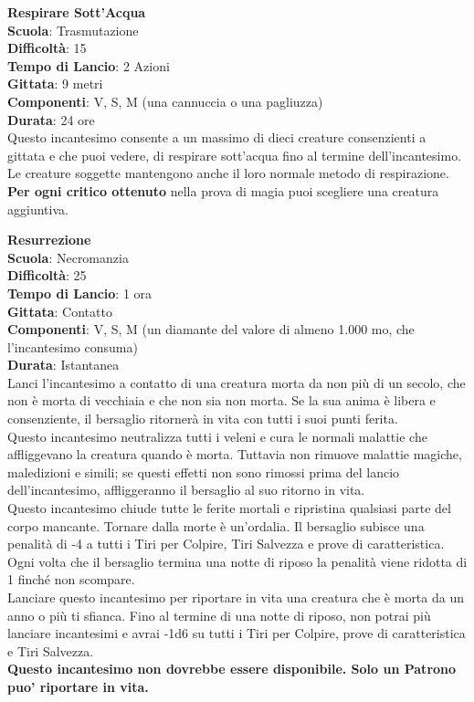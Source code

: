 \begin{multicols}{2}
\medskip\textbf{Respirare Sott'Acqua}\\
\textbf{Scuola}: Trasmutazione\\
\textbf{Difficoltà}: 15\\
\textbf{Tempo di Lancio}: 2 Azioni\\
\textbf{Gittata}: 9 metri\\
\textbf{Componenti}: V, S, M (una cannuccia o una pagliuzza)\\
\textbf{Durata}: 24 ore\\
Questo incantesimo consente a un massimo di dieci creature consenzienti a gittata e che puoi vedere, di respirare sott'acqua fino al termine dell'incantesimo. Le creature soggette mantengono anche il loro normale metodo di respirazione.\\
\textbf{Per ogni critico ottenuto} nella prova di magia puoi scegliere una creatura aggiuntiva.

\medskip\textbf{Resurrezione}\\
\textbf{Scuola}: Necromanzia\\
\textbf{Difficoltà}: 25\\
\textbf{Tempo di Lancio}: 1 ora\\
\textbf{Gittata}: Contatto\\
\textbf{Componenti}: V, S, M (un diamante del valore di almeno 1.000 mo, che l'incantesimo consuma)\\
\textbf{Durata}: Istantanea\\
Lanci l'incantesimo a contatto di una creatura morta da non più di un secolo, che non è morta di vecchiaia e che non sia non morta. Se la sua anima è libera e consenziente, il bersaglio ritornerà in vita con tutti i suoi punti ferita.\\
Questo incantesimo neutralizza tutti i veleni e cura le normali malattie che affliggevano la creatura quando è morta. Tuttavia non rimuove malattie magiche, maledizioni e simili; se questi effetti non sono rimossi prima del lancio dell'incantesimo, affliggeranno il bersaglio al suo ritorno in vita.\\
Questo incantesimo chiude tutte le ferite mortali e ripristina qualsiasi parte del corpo mancante. Tornare dalla morte è un'ordalia. Il bersaglio subisce una penalità di -4 a tutti i Tiri per Colpire, Tiri Salvezza e prove di caratteristica. Ogni volta che il bersaglio termina una notte di riposo la penalità viene ridotta di 1 finché non scompare.\\
Lanciare questo incantesimo per riportare in vita una creatura che è morta da un anno o più ti sfianca. Fino al termine di una notte di riposo, non potrai più lanciare incantesimi e avrai -1d6 su tutti i Tiri per Colpire, prove di caratteristica e Tiri Salvezza.\\
\textbf{Questo incantesimo non dovrebbe essere disponibile. Solo un Patrono puo' riportare in vita.}


\end{multicols}
